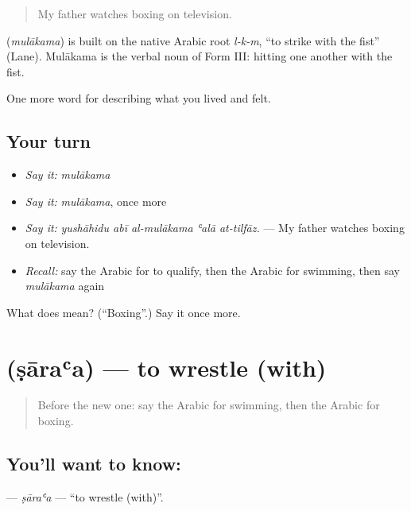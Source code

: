 \begin{quote}
My father watches boxing on television.
\end{quote}

\begin{cousinweb}
\textbf{} (\emph{mulākama}) is built on the native Arabic root \emph{l-k-m}, \textquotedblleft{}to strike with the fist\textquotedblright{} (Lane). Mulākama is the verbal noun of Form III: hitting one another with the fist.
\end{cousinweb}

\begin{grammarlens}[title={What you've built}]
One more word for describing what you lived and felt.
\end{grammarlens}

\subsection*{Your turn}
\begin{itemize}
\raggedright
  \item \emph{Say it:} \emph{mulākama}
  \item \emph{Say it:} \emph{mulākama}, once more
  \item \emph{Say it:} \emph{yushāhidu abī al-mulākama ʿalā at-tilfāz.} — My father watches boxing on television.
  \item \emph{Recall:} say the Arabic for to qualify, then the Arabic for swimming, then say \emph{mulākama} again
\end{itemize}

\begin{tcolorbox}[breakable,colback=teal!4,colframe=teal!35!black,title={Before you move on}]
What does  mean? (\textquotedblleft{}Boxing\textquotedblright{}.) Say it once more.
\end{tcolorbox}
\section[\texorpdfstring{\ar{صارع} (ṣāraʿa)}{صارع (ṣāraʿa)}]{ (ṣāraʿa) — to wrestle (with)}

\label{lesson:AR-C548-saraa}



\begin{quote}
Before the new one: say the Arabic for swimming, then the Arabic for boxing.
\end{quote}

\subsection*{You'll want to know: }
\textbf{} — \emph{ṣāraʿa} — \textquotedblleft{}to wrestle (with)\textquotedblright{}.

